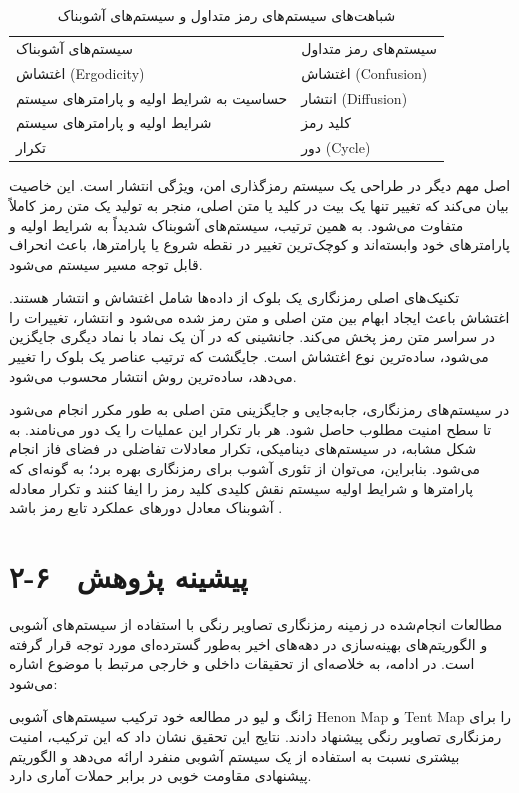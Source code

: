 \begin{table}[h]
\centering
\small
\begin{tabular}{ll}
\hline
سیستم‌های آشوبناک & سیستم‌های رمز متداول \\
اغتشاش (‎Ergodicity‎) & اغتشاش (‎Confusion‎) \\
حساسیت به شرایط اولیه و پارامترهای سیستم & انتشار (‎Diffusion‎) \\
شرایط اولیه و پارامترهای سیستم & کلید رمز \\
تکرار & دور (‎Cycle‎) \\
\hline
\end{tabular}
\caption{شباهت‌های سیستم‌های رمز متداول و سیستم‌های آشوبناک}
\end{table}

اصل مهم دیگر در طراحی یک سیستم رمزگذاری امن، ویژگی انتشار است. این خاصیت بیان می‌کند که تغییر تنها یک بیت در کلید یا متن اصلی، منجر به تولید یک متن رمز کاملاً متفاوت می‌شود. به همین ترتیب، سیستم‌های آشوبناک شدیداً به شرایط اولیه و پارامترهای خود وابسته‌اند و کوچک‌ترین تغییر در نقطه شروع یا پارامترها، باعث انحراف قابل توجه مسیر سیستم می‌شود\cite{ref23}.

تکنیک‌های اصلی رمزنگاری یک بلوک از داده‌ها شامل اغتشاش و انتشار هستند. اغتشاش باعث ایجاد ابهام بین متن اصلی و متن رمز شده می‌شود و انتشار، تغییرات را در سراسر متن رمز پخش می‌کند. جانشینی که در آن یک نماد با نماد دیگری جایگزین می‌شود، ساده‌ترین نوع اغتشاش است. جایگشت که ترتیب عناصر یک بلوک را تغییر می‌دهد، ساده‌ترین روش انتشار محسوب می‌شود.

در سیستم‌های رمزنگاری، جابه‌جایی و جایگزینی متن اصلی به طور مکرر انجام می‌شود تا سطح امنیت مطلوب حاصل شود. هر بار تکرار این عملیات را یک دور می‌نامند. به شکل مشابه، در سیستم‌های دینامیکی، تکرار معادلات تفاضلی در فضای فاز انجام می‌شود. بنابراین، می‌توان از تئوری آشوب برای رمزنگاری بهره برد؛ به گونه‌ای که پارامترها و شرایط اولیه سیستم نقش کلیدی کلید رمز را ایفا کنند و تکرار معادله آشوبناک معادل دورهای عملکرد تابع رمز باشد \cite{ref33}.

\section{۲-۶  پیشینه پژوهش}

مطالعات انجام‌شده در زمینه رمزنگاری تصاویر رنگی با استفاده از سیستم‌های آشوبی و الگوریتم‌های بهینه‌سازی در دهه‌های اخیر به‌طور گسترده‌ای مورد توجه قرار گرفته است. در ادامه، به خلاصه‌ای از  تحقیقات داخلی و خارجی مرتبط با موضوع اشاره می‌شود:

ژانگ و لیو\cite{ref3} در مطالعه خود ترکیب سیستم‌های آشوبی ‎Henon‎ ‎Map‎ و ‎Tent‎ ‎Map‎ را برای رمزنگاری تصاویر رنگی پیشنهاد دادند. نتایج این تحقیق نشان داد که این ترکیب، امنیت بیشتری نسبت به استفاده از یک سیستم آشوبی منفرد ارائه می‌دهد و الگوریتم پیشنهادی مقاومت خوبی در برابر حملات آماری دارد.

